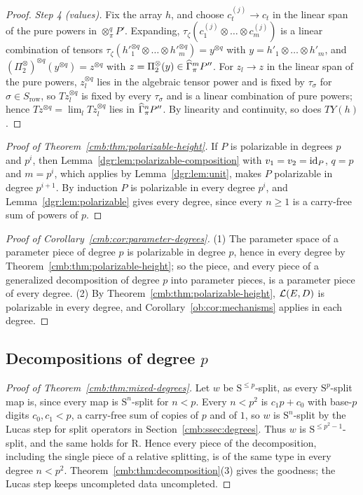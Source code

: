 \begin{proof}
\emph{Step 4 (values).} Fix the array $h$, and choose $c^{(j)}_t\to c_t$ in the linear span of the pure powers in
$\otimes^q_\pi P'$. Expanding, $\tau_\zeta(c^{(j)}_1\otimes\dots\otimes c^{(j)}_m)$ is a linear combination of tensors
$\tau_\zeta(h'^{\otimes q}_1\otimes\dots\otimes h'^{\otimes q}_m)=y^{\otimes q}$ with $y=h'_1\otimes\dots\otimes h'_m$, and
$(\Pi_2^\otimes)^{\otimes q}(y^{\otimes q})=z^{\otimes q}$ with $z=\Pi_2^\otimes(y)\in\widehat\Gamma^m_\pi P''$. For $z_l\to z$ in
the linear span of the pure powers, $z_l^{\otimes q}$ lies in the algebraic tensor power and is fixed by $\tau_\sigma$ for
$\sigma\in S_{\mathrm{row}}$, so $Tz_l^{\otimes q}$ is fixed by every $\tau_\sigma$ and is a linear combination of pure
powers; hence $Tz^{\otimes q}=\lim_lTz_l^{\otimes q}$ lies in $\widehat\Gamma^n_\pi P''$. By linearity and continuity, so does
$TY(h)$.
\end{proof}

\begin{proof}[Proof of Theorem~\ref{cmb:thm:polarizable-height}]
If $P$ is polarizable in degrees $p$ and $p^i$, then Lemma~\ref{dgr:lem:polarizable-composition} with $v_1=v_2=\mathrm{id}_P$,
$q=p$ and $m=p^i$, which applies by Lemma~\ref{dgr:lem:unit}, makes $P$ polarizable in degree $p^{i+1}$. By induction $P$
is polarizable in every degree $p^i$, and Lemma~\ref{dgr:lem:polarizable} gives every degree, since every $n\ge1$ is a
carry-free sum of powers of $p$.
\end{proof}

\begin{proof}[Proof of Corollary~\ref{cmb:cor:parameter-degrees}]
(1) The parameter space of a parameter piece of degree $p$ is polarizable in degree $p$, hence in every degree by
Theorem~\ref{cmb:thm:polarizable-height}; so the piece, and every piece of a generalized decomposition of degree $p$ into
parameter pieces, is a parameter piece of every degree. (2) By Theorem~\ref{cmb:thm:polarizable-height}, $\mathcal L(E,D)$ is
polarizable in every degree, and Corollary~\ref{ob:cor:mechanisms} applies in each degree.
\end{proof}

\subsection{Decompositions of degree \texorpdfstring{$p$}{p}}\label{dgr:ssec:decompositions}

\begin{proof}[Proof of Theorem~\ref{cmb:thm:mixed-degrees}]
Let $w$ be $\mathrm S^{\le p}$-split, as every $\mathrm S^p$-split map is, since every map is $\mathrm S^n$-split for $n<p$.
Every $n<p^2$ is $c_1p+c_0$ with base-$p$ digits $c_0,c_1<p$, a carry-free sum of copies of $p$ and of $1$, so $w$ is
$\mathrm S^n$-split by the Lucas step for split operators in Section~\ref{cmb:ssec:degrees}. Thus $w$ is
$\mathrm S^{\le p^2-1}$-split, and the same holds for $\mathrm R$. Hence every piece of the decomposition, including the
single piece of a relative splitting, is of the same type in every degree $n<p^2$. Theorem~\ref{cmb:thm:decomposition}(3)
gives the goodness; the Lucas step keeps uncompleted data uncompleted.
\end{proof}

